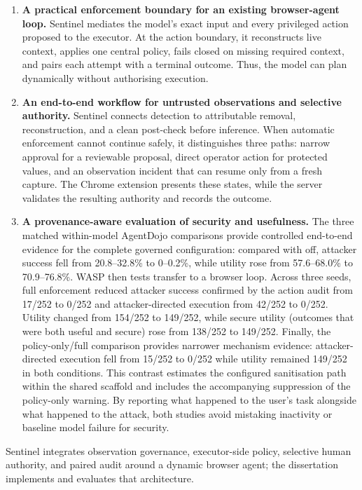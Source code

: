 \begin{enumerate}
  \item \textbf{A practical enforcement boundary for an existing browser-agent
  loop.} Sentinel mediates the model's exact input and every privileged action
  proposed to the executor. At the action boundary, it reconstructs live
  context, applies one central policy, fails closed on missing required context,
  and pairs each attempt with a terminal outcome. Thus, the model can plan
  dynamically without authorising execution.

  \item \textbf{An end-to-end workflow for untrusted observations and selective
  authority.} Sentinel connects detection to attributable removal,
  reconstruction, and a clean post-check before inference. When automatic
  enforcement cannot continue safely, it distinguishes three paths: narrow
  approval for a reviewable proposal, direct operator action for protected
  values, and an observation incident that can resume only from a fresh capture.
  The Chrome extension presents these states, while the server validates the
  resulting authority and records the outcome.

  \item \textbf{A provenance-aware evaluation of security and usefulness.}
  The three matched within-model AgentDojo comparisons provide controlled
  end-to-end evidence for the complete governed configuration: compared with
  off, attacker success fell from 20.8--32.8\% to 0--0.2\%, while utility rose
  from 57.6--68.0\% to 70.9--76.8\%. WASP then tests transfer to a browser loop.
  Across three seeds, full enforcement reduced attacker success confirmed by
  the action audit from 17/252 to 0/252 and attacker-directed execution from
  42/252 to 0/252. Utility changed from 154/252 to 149/252, while secure utility
  (outcomes that were both useful and secure) rose from 138/252 to 149/252.
  Finally, the policy-only/full comparison provides narrower mechanism evidence:
  attacker-directed execution fell from 15/252 to 0/252 while utility remained
  149/252 in both conditions. This contrast estimates the configured
  sanitisation path within the shared scaffold and includes the accompanying
  suppression of the policy-only warning. By reporting what happened to the
  user's task alongside what happened to the attack, both studies avoid
  mistaking inactivity or baseline model failure for security.
\end{enumerate}

Sentinel integrates observation governance, executor-side policy, selective
human authority, and paired audit around a dynamic browser agent; the
dissertation implements and evaluates that architecture.


